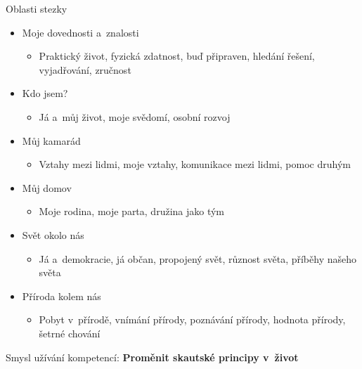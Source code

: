 \documentclass[compress, ucs, xelatex, xcolor=dvipsnames, print,
  hyperref={
    bookmarks=true,
    unicode=true,
    colorlinks=true,
    plainpages=false,
    pdfkeywords={Skaut, Junak, Skauting, Vychovna metoda},
    linkcolor=Black,
    anchorcolor=Black,
    citecolor=OliveGreen,
    filecolor=OliveGreen,
    menucolor=Black,
    urlcolor=OliveGreen,
    pdftex}
  ]{beamer}
\begin{document}
\begin{frame}{Oblasti stezky}
  \begin{itemize}
    \item Moje dovednosti a~znalosti
    \begin{itemize}
      \item Praktický život, fyzická zdatnost, buď připraven, hledání řešení, vyjadřování, zručnost
    \end{itemize}
    \item Kdo jsem?
    \begin{itemize}
      \item Já a~můj život, moje svědomí, osobní rozvoj
    \end{itemize}
    \item Můj kamarád
    \begin{itemize}
      \item Vztahy mezi lidmi, moje vztahy, komunikace mezi lidmi, pomoc druhým
    \end{itemize}
    \item Můj domov
    \begin{itemize}
      \item Moje rodina, moje parta, družina jako tým
    \end{itemize}
    \item Svět okolo nás
    \begin{itemize}
      \item Já a~demokracie, já občan, propojený svět, různost světa, příběhy našeho světa
    \end{itemize}
    \item Příroda kolem nás
    \begin{itemize}
      \item Pobyt v~přírodě, vnímání přírody, poznávání přírody, hodnota přírody, šetrné chování
    \end{itemize}
  \end{itemize}
  \alert{Smysl užívání kompetencí: \textbf{Proměnit skautské principy v~život}}
\end{frame}
\end{document}
